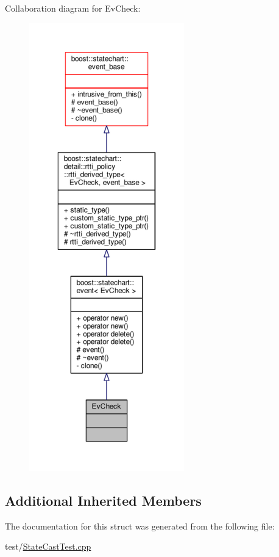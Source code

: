 Collaboration diagram for Ev\+Check\+:
\nopagebreak
\begin{figure}[H]
\begin{center}
\leavevmode
\includegraphics[height=550pt]{struct_ev_check__coll__graph}
\end{center}
\end{figure}
\subsection*{Additional Inherited Members}


The documentation for this struct was generated from the following file\+:\begin{DoxyCompactItemize}
\item 
test/\mbox{\hyperlink{_state_cast_test_8cpp}{State\+Cast\+Test.\+cpp}}\end{DoxyCompactItemize}
